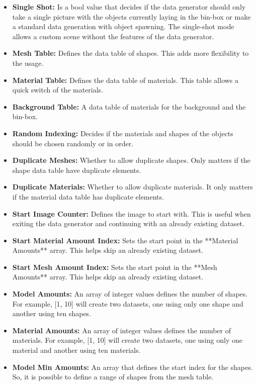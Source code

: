 		\begin{itemize}
			\item \textbf{Single Shot:} Is a bool value that decides if the data generator should only take a single picture with the objects currently laying in the bin-box or make a standard data generation with object spawning. The single-shot mode allows a custom scene without the features of the data generator.
			\item \textbf{Mesh Table:} Defines the data table of shapes. This adds more flexibility to the usage.
			\item \textbf{Material Table:} Defines the data table of materials. This table allows a quick switch of the materials.
			\item \textbf{Background Table:} A data table of materials for the background and the bin-box.
			\item \textbf{Random Indexing:} Decides if the materials and shapes of the objects should be chosen randomly or in order.
			\item \textbf{Duplicate Meshes:} Whether to allow duplicate shapes. Only matters if the shape data table have duplicate elements.
			\item \textbf{Duplicate Materials:} Whether to allow duplicate materials. It only matters if the material data table has duplicate elements.
			\item  \textbf{Start Image Counter:} Defines the image to start with. This is useful when exiting the data generator and continuing with an already existing dataset.
			\item \textbf{Start Material Amount Index:} Sets the start point in the **Material Amounts** array. This helps skip an already existing dataset.
			\item \textbf{Start Mesh Amount Index:} Sets the start point in the **Mesh Amounts** array. This helps skip an already existing dataset.
			\item \textbf{Model Amounts:} An array of integer values defines the number of shapes. For example, [1, 10] will create two datasets, one using only one shape and another using ten shapes.
			\item \textbf{Material Amounts:} An array of integer values defines the number of materials. For example, [1, 10] will create two datasets, one using only one material and another using ten materials.
			\item \textbf{Model Min Amounts:} An array that defines the start index for the shapes. So, it is possible to define a range of shapes from the mesh table.

\end{itemize}
